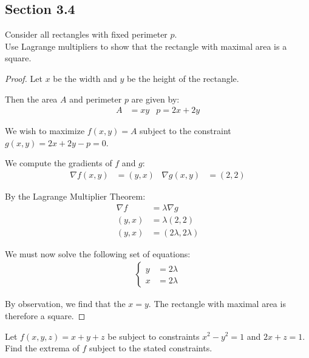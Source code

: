 \subsection{Section 3.4}

\begin{tcolorbox}[
        title={Problem 2},
        valign=center,
        nobeforeafter,
        colframe=gray!95!black
    ]
Consider all rectangles with fixed perimeter \(p\). \\

Use Lagrange multipliers to show that the rectangle with maximal area is a square.
\end{tcolorbox}

\begin{proof}
Let \(x\) be the width and \(y\) be the height of the rectangle.

Then the area \(A\) and perimeter \(p\) are given by:
\begin{align}
    A &= xy & p = 2x + 2y
\end{align}

We wish to maximize \(f(x, y) = A\) subject to the constraint \(g(x, y) = 2x + 2y - p = 0\).

We compute the gradients of \(f\) and \(g\):
\begin{align}
    \nabla f(x, y) &= \left(y, x\right) & \nabla g(x, y) &= \left(2, 2\right) 
\end{align}

By the Lagrange Multiplier Theorem:
\begin{align}
    \nabla f &= \lambda \nabla g \\
    \left(y, x\right) &= \lambda \left(2, 2\right) \\
    \left(y, x\right) &= \left(2\lambda, 2\lambda\right)
\end{align}

We must now solve the following set of equations:
\begin{align}
    \begin{cases}
        y &= 2\lambda \\
        x &= 2\lambda
    \end{cases}
\end{align}

By observation, we find that the \(x = y\). The rectangle with maximal area is therefore a square.
\end{proof}

\begin{tcolorbox}[
        title={Problem 6},
        valign=center,
        nobeforeafter,
        colframe=gray!95!black
    ]
Let \(f(x, y, z) = x + y + z\) be subject to constraints \(x^2 - y^2 = 1\) and \(2x + z = 1\). \\

Find the extrema of \(f\) subject to the stated constraints.
\end{tcolorbox}

